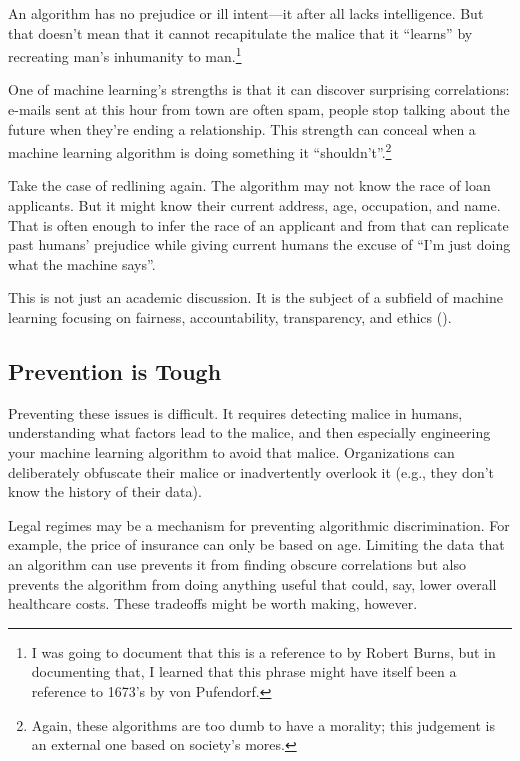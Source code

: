 An algorithm has no prejudice or ill intent---it after all lacks
intelligence.  But that doesn't mean that it cannot recapitulate the
malice that it ``learns'' by recreating man's inhumanity to
man.\footnote{I was going to document that this is a reference to
   by Robert Burns, but in documenting that, I learned
  that this phrase might have itself been a reference to 1673's
   by von
  Pufendorf.}

One of machine learning's strengths is that it can discover surprising
correlations: e-mails sent at this hour from town are often spam,
people stop talking about the future when they're ending a
relationship.  This strength can conceal when a machine learning
algorithm is doing something it ``shouldn't''.\footnote{Again, these
  algorithms are too dumb to have a morality; this judgement is an
  external one based on society's mores.}

Take the case of redlining again.  The algorithm may not know the race
of loan applicants.  But it might know their current address, age,
occupation, and name.  That is often enough to infer the race of an
applicant and from that can replicate past humans' prejudice while
giving current humans the excuse of ``I'm just doing what the machine
says''.

This is not just an academic discussion.  It is the subject of a
subfield of machine learning focusing on fairness, accountability,
transparency, and ethics ().  

\subsection{Prevention is Tough}

Preventing these issues is difficult.  It requires detecting malice in
humans, understanding what factors lead to the malice, and then
especially engineering your machine learning algorithm to avoid that
malice.  Organizations can deliberately obfuscate their malice or
inadvertently overlook it (e.g., they don't know the history of their
data).

Legal regimes may be a mechanism for preventing algorithmic
discrimination.  For example, the price of insurance can only be based
on age.  Limiting the data that an algorithm can use prevents it from
finding obscure correlations but also prevents the algorithm from
doing anything useful that could, say, lower overall healthcare costs.
These tradeoffs might be worth making, however.

